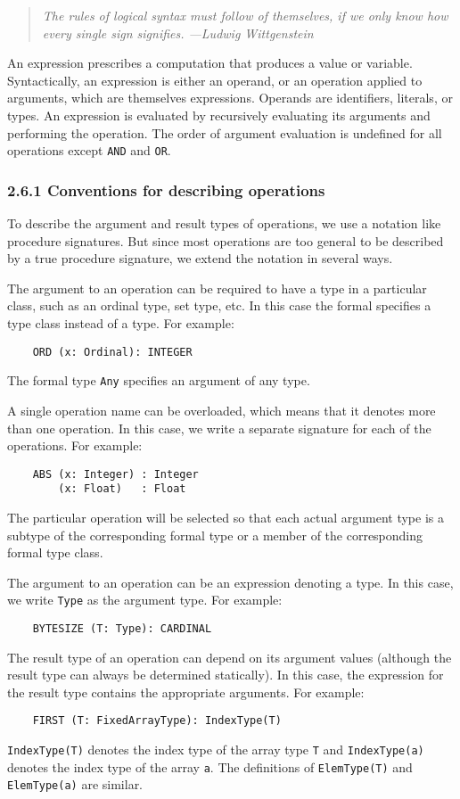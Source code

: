 \documentclass[10pt]{article}
\begin{document}
\begin{quote}
  \emph{The rules of logical syntax must follow of themselves, if we only
    know how every single sign signifies.  ---Ludwig Wittgenstein}
\end{quote}

An expression prescribes a computation that produces a value or variable.
Syntactically, an expression is either an operand, or an operation applied to
arguments, which are themselves expressions.  Operands are identifiers,
literals, or types.  An expression is evaluated by recursively evaluating its
arguments and performing the operation.  The order of argument evaluation is
undefined for all operations except \verb|AND| and \verb|OR|.

\subsubsection*{2.6.1 Conventions for describing operations}

To describe the argument and result types of operations, we use a notation
like procedure signatures.  But since most operations are too general to be
described by a true procedure signature, we extend the notation in several
ways.

The argument to an operation can be required to have a type in a particular
class, such as an ordinal type, set type, etc.  In this case the formal
specifies a type class instead of a type.  For example:
\begin{verbatim}
    ORD (x: Ordinal): INTEGER
\end{verbatim}
The formal type \verb|Any| specifies an argument of any type.

A single operation name can be overloaded, which means that it denotes more
than one operation.  In this case, we write a separate signature for each of
the operations.  For example:
\begin{verbatim}
    ABS (x: Integer) : Integer
        (x: Float)   : Float
\end{verbatim}
The particular operation will be selected so that each actual argument type is
a subtype of the corresponding formal type or a member of the corresponding
formal type class.

The argument to an operation can be an expression denoting a type.  In this
case, we write \verb|Type| as the argument type.  For example:
\begin{verbatim}
    BYTESIZE (T: Type): CARDINAL
\end{verbatim}
The result type of an operation can depend on its argument values (although
the result type can always be determined statically).  In this case, the
expression for the result type contains the appropriate arguments.  For
example:
\begin{verbatim}
    FIRST (T: FixedArrayType): IndexType(T)
\end{verbatim}
\verb|IndexType(T)| denotes the index type of the array type \verb|T| and
\verb|IndexType(a)| denotes the index type of the array \verb|a|.  The
definitions of \verb|ElemType(T)| and \verb|ElemType(a)| are similar.
\end{document}
